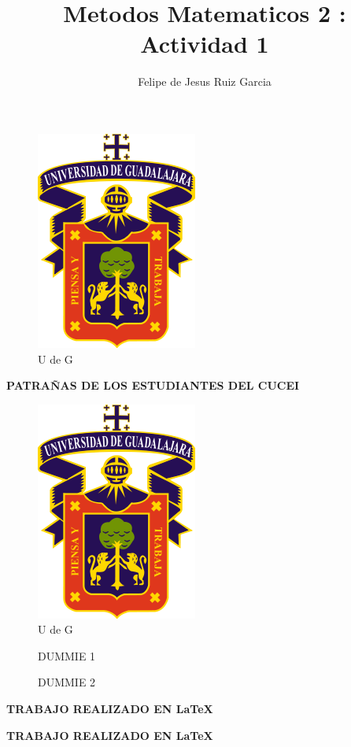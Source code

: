 \documentclass[12pt,a4paper]{book}
\author{Felipe de Jesus Ruiz Garcia}
\title{Metodos Matematicos 2 : Actividad 1}
\begin{document}
\begin{figure}[hbtp]
\centering
\includegraphics[scale=.5]{../PRE/udg.png}\\
U de G
\end{figure}

\begin{center}
\textbf{PATRAÑAS DE LOS ESTUDIANTES DEL CUCEI}
\end{center}
 \bigskip

\begin{figure}[hbtp]
\centering
\includegraphics[scale=.5]{udg.png}\\
U de G
\end{figure}

\begin{figure}[hbtp]
\centering
\caption{DUMMIE 1}
\caption{DUMMIE 2}
\end{figure}



\begin{center}
\textbf{TRABAJO REALIZADO EN \LaTeX} 
\end{center}


\begin{tiny}
\textbf{TRABAJO REALIZADO EN \LaTeX}
\end{tiny}
\end{document}
